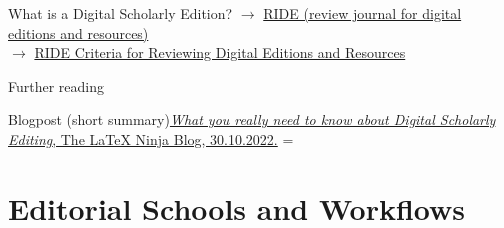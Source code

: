 \begin{frame}[allowframebreaks]{What is a Digital Scholarly Edition?}
$\to$ \href{https://ride.i-d-e.de/}{RIDE (review journal for digital editions and resources)} \\
$\to$ \href{https://ride.i-d-e.de/reviewers/catalogue-criteria-for-reviewing-digital-editions-and-resources/}{RIDE Criteria for Reviewing Digital Editions and Resources}
\end{frame}


\begin{frame}{Further reading}
    \bigskip 
    
  \begin{block}{Blogpost (short summary)}\footnotesize \href{https://latex-ninja.com/2022/10/30/what-you-really-need-to-know-about-digital-scholarly-editing/}{\emph{What you really need to know about Digital Scholarly Editing}, The \LaTeX{} Ninja Blog, 30.10.2022.} = \parencite{LaTeXNinjaDSE2022}
  \end{block}
    
\end{frame}

\section{Editorial Schools and Workflows}

